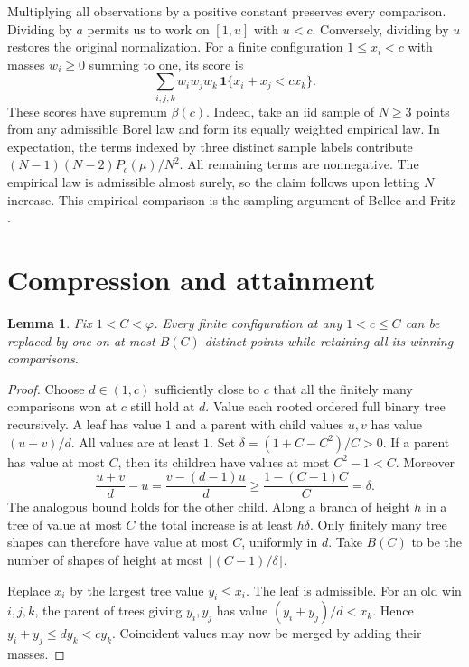 \documentclass[11pt]{article}
\newtheorem{lemma}[theorem]{Lemma}
\newcommand{\ph}{\varphi}
\begin{document}
Multiplying all observations by a positive constant preserves every
comparison. Dividing by $a$ permits us to work on $[1,u]$ with $u<c$.
Conversely, dividing by $u$ restores the original normalization.
For a finite configuration $1\le x_i<c$ with masses $w_i\ge0$ summing
to one, its score is
\[
  \sum_{i,j,k}w_iw_jw_k\,\mathbf1\{x_i+x_j<cx_k\}.
\]
These scores have supremum $\beta(c)$. Indeed, take an iid sample of
$N\ge3$ points from any admissible Borel law and form its equally
weighted empirical law. In expectation, the terms indexed by three
distinct sample labels contribute $(N-1)(N-2)P_c(\mu)/N^2$.
All remaining terms are nonnegative. The empirical law is admissible
almost surely, so the claim follows upon letting $N$ increase. This
empirical comparison is the sampling argument of Bellec and Fritz
\cite[Theorem~2.4 and Remark~2.5]{bf}.

\section{Compression and attainment}
\begin{lemma}\label{le:compact}
Fix $1<C<\ph$. Every finite configuration at any $1<c\le C$ can be
replaced by one on at most $B(C)$ distinct points while retaining all
its winning comparisons.
\end{lemma}
\begin{proof}
Choose $d\in(1,c)$ sufficiently close to $c$ that all the finitely
many comparisons won at $c$ still hold at $d$. Value each rooted ordered full binary tree recursively. A leaf has
value $1$ and a parent with child values $u,v$ has value $(u+v)/d$. All values are at least
$1$. Set $\delta=(1+C-C^2)/C>0$. If a parent has value at most $C$,
then its children have values at most $C^2-1<C$. Moreover
\[
 \frac{u+v}{d}-u
   =\frac{v-(d-1)u}{d}
   \ge \frac{1-(C-1)C}{C}=\delta .
\]
The analogous bound holds for the other child. Along a branch of
height $h$ in a tree of value at most $C$ the total increase is at
least $h\delta$. Only finitely many tree shapes can therefore have
value at most $C$, uniformly in $d$. Take $B(C)$ to be the number of
shapes of height at most $\lfloor(C-1)/\delta\rfloor$.

Replace $x_i$ by the largest tree value $y_i\le x_i$. The leaf is
admissible. For an old win $i,j,k$, the parent of trees giving $y_i,y_j$
has value $(y_i+y_j)/d<x_k$. Hence $y_i+y_j\le d y_k<c y_k$.
Coincident values may now be merged by adding their masses.
\end{proof}
\end{document}
